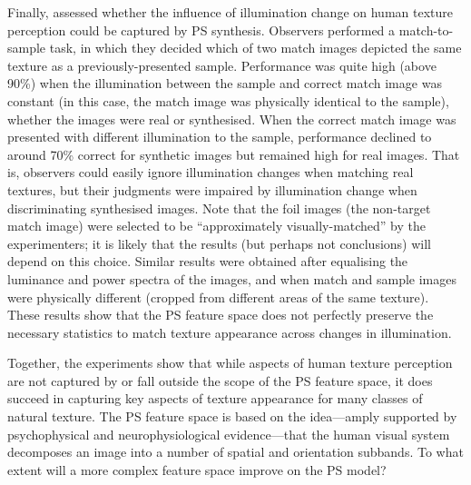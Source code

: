 \documentclass[doc, 11pt,a4paper,natbib]{apa6}\usepackage[]{graphicx}\usepackage[]{color}
\begin{document}

Finally, \citet{balas_invariant_2015} assessed whether the influence of illumination change on human texture perception could be captured by PS synthesis.
Observers performed a match-to-sample task, in which they decided which of two match images depicted the same texture as a previously-presented sample.
Performance was quite high (above 90\%) when the illumination between the sample and correct match image was constant (in this case, the match image was physically identical to the sample), whether the images were real or synthesised.
When the correct match image was presented with different illumination to the sample, performance declined to around 70\% correct for synthetic images but remained high for real images.
That is, observers could easily ignore illumination changes when matching real textures, but their judgments were impaired by illumination change when discriminating synthesised images.
Note that the foil images (the non-target match image) were selected to be ``approximately visually-matched'' by the experimenters; it is likely that the results (but perhaps not conclusions) will depend on this choice.
Similar results were obtained after equalising the luminance and power spectra of the images, and when match and sample images were physically different (cropped from different areas of the same texture). 
These results show that the PS feature space does not perfectly preserve the necessary statistics to match texture appearance across changes in illumination.

Together, the experiments show that while aspects of human texture perception are not captured by or fall outside the scope of the PS feature space, it does succeed in capturing key aspects of texture appearance for many classes of natural texture. 
The PS feature space is based on the idea---amply supported by psychophysical and neurophysiological evidence---that the human visual system decomposes an image into a number of spatial and orientation subbands.
To what extent will a more complex feature space improve on the PS model?
\end{document}
